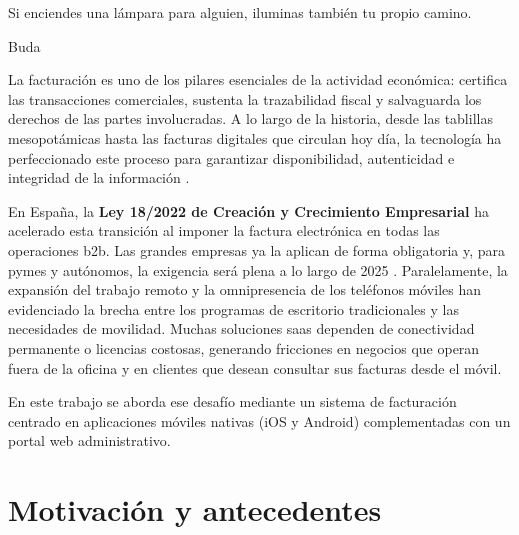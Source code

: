 \epigraph{Si enciendes una lámpara para alguien, iluminas también tu propio camino.}{Buda}

\begin{large}
  
La facturación es uno de los pilares esenciales de la actividad económica: certifica las transacciones comerciales, sustenta la trazabilidad fiscal y salvaguarda los derechos de las partes involucradas. A lo largo de la historia, desde las tablillas mesopotámicas hasta las facturas digitales que circulan hoy día, la tecnología ha perfeccionado este proceso para garantizar disponibilidad, autenticidad e integridad de la información \cite{origen_facturas}.

En España, la \textbf{Ley 18/2022 de Creación y Crecimiento Empresarial} ha acelerado esta transición al imponer la factura electrónica en todas las operaciones \gls{b2b}. Las grandes empresas ya la aplican de forma obligatoria y, para pymes y autónomos, la exigencia será plena a lo largo de 2025 \cite{ley18_2022}. Paralelamente, la expansión del trabajo remoto y la omnipresencia de los teléfonos móviles han evidenciado la brecha entre los programas de escritorio tradicionales y las necesidades de movilidad. Muchas soluciones \gls{saas} dependen de conectividad permanente o licencias costosas, generando fricciones en negocios que operan fuera de la oficina y en clientes que desean consultar sus facturas desde el móvil.

En este trabajo se aborda ese desafío mediante un sistema de facturación centrado en aplicaciones móviles nativas (iOS y Android) complementadas con un portal web administrativo.

\end{large}

\section{Motivación y antecedentes}

